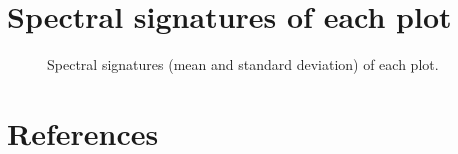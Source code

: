 \documentclass[review]{elsarticle}
\begin{document}
\section{Spectral signatures of each plot}

\begin{figure} [H]
	\begin{center}
		\caption{Spectral signatures (mean and standard deviation) of each plot.}
		\label{fig:spectral_signatures}
	\end{center}
\end{figure}

\pagebreak

\section*{References}


\end{document}
